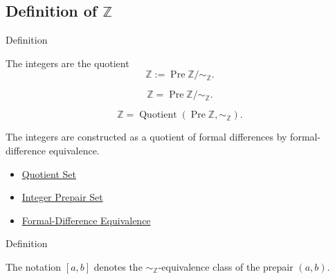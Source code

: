 \subsection*{\texorpdfstring{Definition of $\mathbb{Z}$}{Definition of Z}}

\begin{definitionbox}{Definition}
\begin{definition}[Integers]
\label{def:integers}
The integers are the quotient
\[
\mathbb{Z}:=\operatorname{Pre}\mathbb{Z}/{\sim_{\mathbb{Z}}}.
\]
\end{definition}
\end{definitionbox}


\begin{remark*}
\[
\mathbb{Z}=\operatorname{Pre}\mathbb{Z}/{\sim_{\mathbb{Z}}}.
\]
\end{remark*}

\begin{remark*}
\[
\mathbb{Z}=\operatorname{Quotient}(\operatorname{Pre}\mathbb{Z},\sim_{\mathbb{Z}}).
\]
\end{remark*}

\begin{remark*}[Interpretation]
The integers are constructed as a quotient of formal differences by
formal-difference equivalence.
\end{remark*}

\begin{dependencies}
\begin{itemize}
  \item \hyperref[def:quotient-set]{Quotient Set}
  \item \hyperref[def:integer-prepair-set]{Integer Prepair Set}
  \item \hyperref[def:formal-difference-equivalence]{Formal-Difference Equivalence}
\end{itemize}
\end{dependencies}

\begin{definitionbox}{Definition}
\begin{definition}
\label{def:integer-class-notation}
The notation $[a,b]$ denotes the $\sim_{\mathbb{Z}}$-equivalence class of the
prepair $(a,b)$.
\end{definition}
\end{definitionbox}

